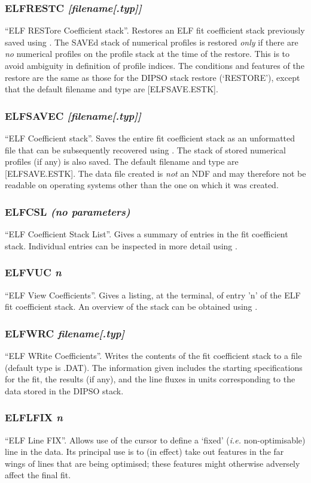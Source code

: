 \documentclass[twoside,11pt,noabs,nolof]{starlink}
\providecommand{\dipcom}[3]{\subsubsection*{\label{COM:#1}\textbf{#1} \emph{#2}}}
\begin{document}
\dipcom{ELFRESTC}{[filename[.typ]]}{Restores an ELF fit co-efficient stack from a binary file }
``ELF RESTore Coefficient stack''. Restores an ELF fit coefficient
stack previously saved using .  The SAVEd stack of numerical
profiles is restored \emph{only} if there are \emph{no} numerical
profiles on the profile stack at the time of the restore. This is to
avoid ambiguity in definition of profile indices. The conditions and
features of the restore are the same as those for the DIPSO stack
restore (`RESTORE'), except that the default filename and type are
[ELFSAVE.ESTK].

\dipcom{ELFSAVEC}{[filename[.typ]]}{Saves an ELF fit co-efficient stack to disk in a binary file}
``ELF   Coefficient stack''. Saves the entire fit coefficient stack
as an unformatted file that can be subsequently recovered using
.  The stack of stored numerical profiles (if any) is also
saved. The default filename and type are [ELFSAVE.ESTK]. The data file
created is \emph{not} an NDF and may therefore not be readable on operating
systems other than the one on which it was created.

\dipcom{ELFCSL}{(no parameters)}{Summarises the entries in the ELF fit co-efficient stack}
``ELF Coefficient Stack List''. Gives a summary of entries in the fit
coefficient stack. Individual entries can be inspected in more detail
using .

\dipcom{ELFVUC}{n}{Lists a single entry of the ELF fit co-efficient stack}
``ELF View Coefficients''. Gives a listing, at the terminal, of entry
'n' of the ELF fit coefficient stack. An overview of the stack can be
obtained using .

\dipcom{ELFWRC}{filename[.typ]}{Writes an ELF fit co-efficient stack to disk in a text file}
``ELF WRite Coefficients''. Writes the contents of the fit coefficient
stack to a file (default type is .DAT). The information given includes
the starting specifications for the fit, the results (if any), and the
line fluxes in units corresponding to the data stored in the DIPSO
stack.

\dipcom{ELFLFIX}{n}{Fits an emission line manually using the cursor}
``ELF Line FIX''. Allows use of the cursor to define a `fixed' (\emph{i.e.} non-optimisable) line in the data. Its principal use is to (in
effect) take out features in the far wings of lines that are being
optimised; these features might otherwise adversely affect the final
fit.
\end{document}
